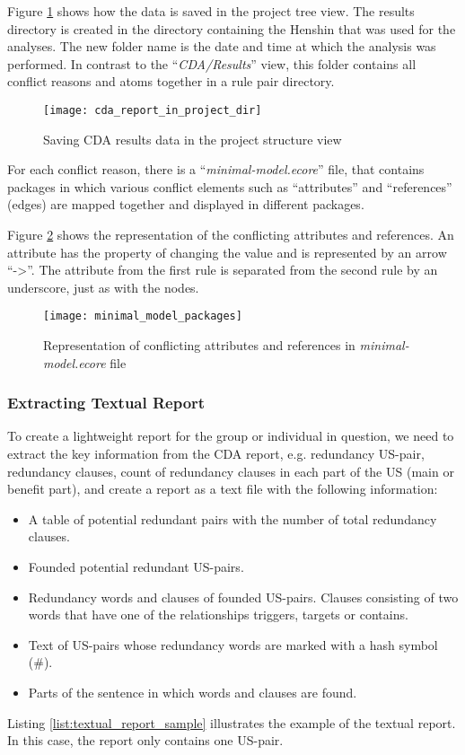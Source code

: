  Figure \ref{fig:cda_report_in_project_dir} shows how the data is saved in the project tree view. The results directory is created in the directory containing the Henshin that was used for the analyses. The new folder name is the date and time at which the analysis was performed. In contrast to the \enquote{\textit{CDA/Results}} view, this folder contains all conflict reasons and atoms together in a rule pair directory.
  \begin{figure}[h]
 	\centering
 	\texttt{[image: cda\_report\_in\_project\_dir]}
 	\caption{Saving CDA results data in the project structure view}\label{fig:cda_report_in_project_dir}
 \end{figure}
 
 For each conflict reason, there is a \enquote{\textit{minimal-model.ecore}} file, that contains packages in which various conflict elements such as \enquote{attributes} and \enquote{references} (edges) are mapped together and displayed in different packages.
 
 Figure \ref{fig:minimal_model_packages} shows the representation of the conflicting attributes and references. An attribute has the property of changing the value and is represented by an arrow \enquote{-\textgreater}. The attribute from the first rule is separated from the second rule by an underscore, just as with the nodes.
  \begin{figure}[h]
 	\centering
 	\texttt{[image: minimal\_model\_packages]}
 	\caption{Representation of conflicting attributes and references in \textit{minimal-model.ecore} file}\label{fig:minimal_model_packages}
 \end{figure}
\subsubsection*{Extracting Textual Report}
To create a lightweight report for the group or individual in question, we need to extract the key information from the CDA report, e.g. redundancy US-pair, redundancy clauses, count of redundancy clauses in each part of the US (main or benefit part), and create a report as a text file with the following information:
\begin{itemize}
	
	\item A table of potential redundant pairs with the number of total redundancy clauses.
	
	\item Founded potential redundant US-pairs.
	
	\item Redundancy words and clauses of founded US-pairs. Clauses consisting of two words that have one of the relationships triggers, targets or contains.
	
	\item Text of US-pairs whose redundancy words are marked with a hash symbol (\#).
	
	\item Parts of the sentence in which words and clauses are found.
\end{itemize}
Listing \ref{list:textual_report_sample} illustrates the example of the textual report. In this case, the report only contains one US-pair.

